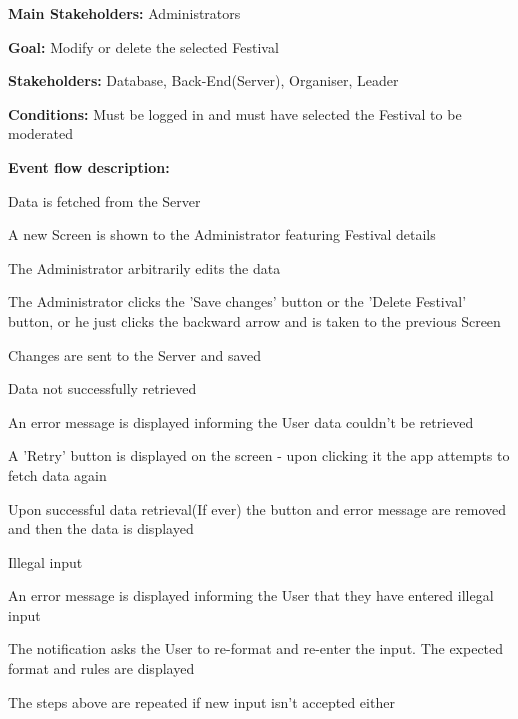				\noindent {}
				\begin{packed_item}
					\item \textbf{Main Stakeholders:} Administrators
					\item \textbf{Goal:} Modify or delete the selected Festival
					\item \textbf{Stakeholders: } Database, Back-End(Server), Organiser, Leader
					\item \textbf{Conditions: } Must be logged in and must have selected the Festival to be moderated
					\item \textbf{Event flow description: }
					\begin{packed_enum}
						\item Data is fetched from the Server
						\item A new Screen is shown to the Administrator featuring Festival details
						\item The Administrator arbitrarily edits the data
						\item The Administrator clicks the 'Save changes' button or the 'Delete Festival' button, or he just clicks the backward arrow and is taken to the previous Screen
						\item Changes are sent to the Server and saved
					\end{packed_enum}
					
					\begin{packed_item}
						\item[1.a] Data not successfully retrieved
						\item[] \begin{packed_enum}
							\item An error message is displayed informing the User data couldn't be retrieved
							\item A 'Retry' button is displayed on the screen - upon clicking it the app attempts to fetch data again
							\item Upon successful data retrieval(If ever) the button and error message are removed and then the data is displayed
						\end{packed_enum}
					
						\item[3.a] Illegal input
						\item[] \begin{packed_enum}
							\item An error message is displayed informing the User that they have entered illegal input
							\item The notification asks the User to re-format and re-enter the input. The expected format and rules are displayed
							\item The steps above are repeated if new input isn't accepted either
						\end{packed_enum}
						

\end{packed_item}
\end{packed_item}
